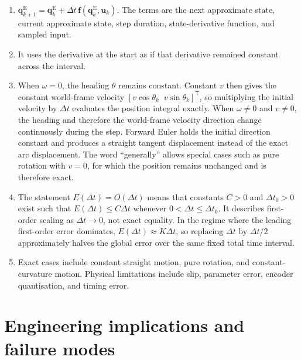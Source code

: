 \documentclass[
  australian,
  12pt,
  letterpaper,
  DIV=11,
  numbers=noendperiod,
  twoside]{scrreprt}
\providecommand{\tightlist}{%
  \setlength{\itemsep}{0pt}\setlength{\parskip}{0pt}}
\begin{document}
\begin{enumerate}
\def\labelenumi{\arabic{enumi}.}
\tightlist
\item
  \(\mathbf q_{k+1}^{\mathrm E}=\mathbf q_k^{\mathrm E}+\Delta t\,\mathbf f(\mathbf q_k^{\mathrm E},\mathbf u_k)\).
  The terms are the next approximate state, current approximate state,
  step duration, state-derivative function, and sampled input.
\item
  It uses the derivative at the start as if that derivative remained
  constant across the interval.
\item
  When \(\omega=0\), the heading \(\theta\) remains constant. Constant
  \(v\) then gives the constant world-frame velocity
  \([v\cos\theta_k\;\;v\sin\theta_k]^\mathsf T\), so multiplying the
  initial velocity by \(\Delta t\) evaluates the position integral
  exactly. When \(\omega\neq0\) and \(v\neq0\), the heading and
  therefore the world-frame velocity direction change continuously
  during the step. Forward Euler holds the initial direction constant
  and produces a straight tangent displacement instead of the exact arc
  displacement. The word ``generally'' allows special cases such as pure
  rotation with \(v=0\), for which the position remains unchanged and is
  therefore exact.
\item
  The statement \(E(\Delta t)=O(\Delta t)\) means that constants \(C>0\)
  and \(\Delta t_0>0\) exist such that \(E(\Delta t)\leq C\Delta t\)
  whenever \(0<\Delta t\leq\Delta t_0\). It describes first-order
  scaling as \(\Delta t\to0\), not exact equality. In the regime where
  the leading first-order error dominates,
  \(E(\Delta t)\approx K\Delta t\), so replacing \(\Delta t\) by
  \(\Delta t/2\) approximately halves the global error over the same
  fixed total time interval.
\item
  Exact cases include constant straight motion, pure rotation, and
  constant-curvature motion. Physical limitations include slip,
  parameter error, encoder quantisation, and timing error.
\end{enumerate}

\section{Engineering implications and failure
modes}\label{engineering-implications-and-failure-modes}
\end{document}
